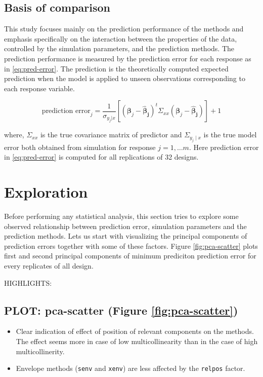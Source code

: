 \documentclass[12pt,3p,authoryear]{elsarticle}
\providecommand{\tightlist}{%
  \setlength{\itemsep}{0pt}\setlength{\parskip}{0pt}}
\theoremstyle{definition}
\theoremstyle{definition}
\theoremstyle{definition}
\theoremstyle{remark}
\begin{document}
\subsection{Basis of comparison}\label{basis-of-comparison}

This study focuses mainly on the prediction performance of the methods
and emphasis specifically on the interaction between the properties of
the data, controlled by the simulation parameters, and the prediction
methods. The prediction performance is measured by the prediction error
for each response as in \eqref{eq:pred-error}. The prediction is the
theoretically computed expected prediction when the model is applied to
unseen observations corresponding to each response variable.

\begin{equation}
\text{prediction error}_j = \frac{1}{\sigma_{y_j|x}}\left[\left(\boldsymbol{\beta}_j - \boldsymbol{\hat{\beta}_j}\right)^t\Sigma_{xx}\left(\boldsymbol{\beta}_j - \boldsymbol{\hat{\beta}_j}\right)\right] + 1
\label{eq:pred-error}
\end{equation}

where, \(\Sigma_{xx}\) is the true covariance matrix of predictor and
\(\Sigma_{y_j\mid x}\) is the true model error both obtained from
simulation for response \(j = 1, \ldots m\). Here prediction error in
\eqref{eq:pred-error} is computed for all replications of 32 designs.

\section{Exploration}\label{exploration}

Before performing any statistical analysis, this section tries to
explore some observed relationship between prediction error, simulation
parameters and the prediction methods. Lets us start with visualizing
the principal components of prediction errors together with some of
these factors. Figure \ref{fig:pca-scatter} plots first and second
principal components of minimum prediciton prediction error for every
replicates of all design.

HIGHLIGHTS:

\subsection{PLOT: pca-scatter (Figure
\ref{fig:pca-scatter})}\label{plot-pca-scatter-figure-reffigpca-scatter}

\begin{itemize}
\tightlist
\item
  Clear indication of effect of position of relevant components on the
  methods. The effect seems more in case of low multicollinearity than
  in the case of high multicollinerity.
\item
  Envelope methods (\texttt{senv} and \texttt{xenv}) are less affected
  by the \texttt{relpos} factor.
\end{itemize}
\end{document}
